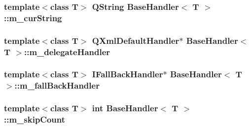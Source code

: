 \subsubsection[{m\+\_\+cur\+String}]{\setlength{\rightskip}{0pt plus 5cm}template$<$class T$>$ {\bf Q\+String} {\bf Base\+Handler}$<$ T $>$\+::m\+\_\+cur\+String\hspace{0.3cm}{\ttfamily [protected]}}\label{class_base_handler_a465e89308ad37f5fe49c2d64365584eb}
\hypertarget{class_base_handler_af433dd7ab3c72d3cff916cff4c1790f3}{}
\subsubsection[{m\+\_\+delegate\+Handler}]{\setlength{\rightskip}{0pt plus 5cm}template$<$class T$>$ {\bf Q\+Xml\+Default\+Handler}$\ast$ {\bf Base\+Handler}$<$ T $>$\+::m\+\_\+delegate\+Handler\hspace{0.3cm}{\ttfamily [protected]}}\label{class_base_handler_af433dd7ab3c72d3cff916cff4c1790f3}
\hypertarget{class_base_handler_af6dba84c4d282e5af104cff6d0967bcf}{}
\subsubsection[{m\+\_\+fall\+Back\+Handler}]{\setlength{\rightskip}{0pt plus 5cm}template$<$class T$>$ {\bf I\+Fall\+Back\+Handler}$\ast$ {\bf Base\+Handler}$<$ T $>$\+::m\+\_\+fall\+Back\+Handler\hspace{0.3cm}{\ttfamily [protected]}}\label{class_base_handler_af6dba84c4d282e5af104cff6d0967bcf}
\hypertarget{class_base_handler_a2227d419cfd154559297bc9599fc9d3d}{}
\subsubsection[{m\+\_\+skip\+Count}]{\setlength{\rightskip}{0pt plus 5cm}template$<$class T$>$ int {\bf Base\+Handler}$<$ T $>$\+::m\+\_\+skip\+Count\hspace{0.3cm}{\ttfamily [protected]}}\label{class_base_handler_a2227d419cfd154559297bc9599fc9d3d}
\hypertarget{class_base_handler_a8e2ef23c5a489fe981e33eba88538635}{}

